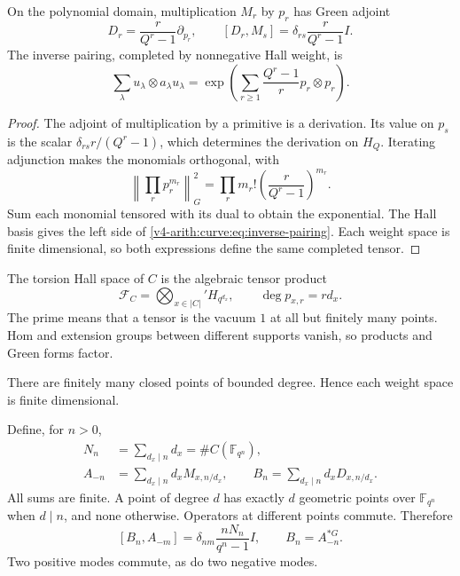 \begin{proposition}\label{v4-arith:curve:prop:adjoints}
On the polynomial domain, multiplication $M_r$ by $p_r$ has Green
adjoint
\[
 D_r=\frac r{Q^r-1}\partial_{p_r},\qquad
 [D_r,M_s]=\delta_{rs}\frac r{Q^r-1}I.
\]
The inverse pairing, completed by nonnegative Hall weight, is
\begin{equation}\label{v4-arith:curve:eq:inverse-pairing}
 \sum_\lambda u_\lambda\otimes a_\lambda u_\lambda
 =\exp\left(\sum_{r\geq1}\frac{Q^r-1}{r}p_r\otimes p_r\right).
\end{equation}
\end{proposition}
\begin{proof}
The adjoint of multiplication by a primitive is a derivation.
Its value on $p_s$ is the scalar
$\delta_{rs}r/(Q^r-1)$, which determines the derivation on $H_Q$.
Iterating adjunction makes the monomials orthogonal, with
\[
 \left\|\prod_r p_r^{m_r}\right\|_G^2
 =\prod_r m_r!\left(\frac r{Q^r-1}\right)^{m_r}.
\]
Sum each monomial tensored with its dual to obtain the exponential.
The Hall basis gives the left side of
\eqref{v4-arith:curve:eq:inverse-pairing}. Each weight space is finite
dimensional, so both expressions define the same completed tensor.
\end{proof}

The torsion Hall space of $C$ is the algebraic tensor product
\[
 \mathcal F_C=\bigotimes_{x\in|C|}' H_{q^{d_x}},
 \qquad \deg p_{x,r}=rd_x.
\]
The prime means that a tensor is the vacuum $1$ at all but finitely
many points. Hom and extension groups between different supports
vanish, so products and Green forms factor.

There are finitely many
closed points of bounded degree. Hence each weight space is finite
dimensional.

Define, for $n>0$,
\begin{equation}\label{v4-arith:curve:eq:global-modes}
 \begin{split}
 N_n&=\sum_{d_x\mid n}d_x=\#C(\mathbb F_{q^n}),\\
 A_{-n}&=\sum_{d_x\mid n}d_xM_{x,n/d_x},\qquad
 B_n=\sum_{d_x\mid n}d_xD_{x,n/d_x}.
 \end{split}
\end{equation}
All sums are finite. A point of degree $d$ has exactly $d$ geometric
points over $\mathbb F_{q^n}$ when $d\mid n$, and none otherwise.
Operators at different points commute. Therefore
\begin{equation}\label{v4-arith:curve:eq:green-commutator}
 [B_n,A_{-m}]=\delta_{nm}\frac{nN_n}{q^n-1}I,
 \qquad B_n=A_{-n}^{*G}.
\end{equation}
Two positive modes commute, as do two negative modes.

